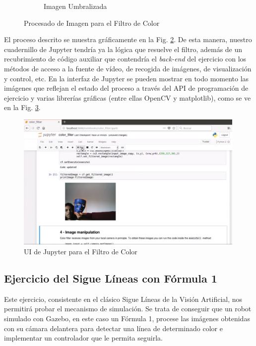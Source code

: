 \begin{figure}
\begin{subfigure}{.32\textwidth}
  \caption{Imagen Umbralizada}
  \label{mask}
\end{subfigure}
\caption{Procesado de Imagen para el Filtro de Color}
\label{procesado}
\end{figure}

El proceso descrito se muestra gráficamente en la Fig. \ref{procesado}. De esta manera, nuestro cuadernillo de Jupyter tendría ya la lógica que resuelve el filtro, además de un recubrimiento de código auxiliar que contendría el \textit{back-end} del ejercicio con los métodos de acceso a la fuente de vídeo, de recogida de imágenes, de visualización y control, etc. En la interfaz de Jupyter se pueden mostrar en todo momento las imágenes que reflejan el estado del proceso a través del API de programación de ejercicio y varias librerías gráficas (entre ellas OpenCV y matplotlib), como se ve en la Fig. \ref{ui_cf_jupyter}.

\begin{figure}[!hbtp]  \centering\noindent
    \includegraphics[width=0.99\textwidth]{figures/ui_cf_jupyter.jpg}
    \caption{UI de Jupyter para el Filtro de Color}
    \label{ui_cf_jupyter}
\end{figure}

\subsection{Ejercicio del Sigue Líneas con Fórmula 1}

Este ejercicio, consistente en el clásico Sigue Líneas de la Visión Artificial, nos permitirá probar el mecanismo de simulación. Se trata de conseguir que un robot simulado con Gazebo, en este caso un Fórmula 1, procese las imágenes obtenidas con su cámara delantera para detectar una línea de determinado color e implementar un controlador que le permita seguirla.

